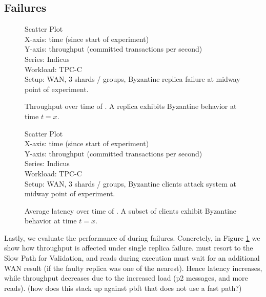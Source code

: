 \subsection{Failures}

\begin{figure}
  Scatter Plot\\
  X-axis: time (since start of experiment)\\
  Y-axis: throughput (committed transactions per second)\\
  Series: Indicus\\
  Workload: TPC-C\\
  Setup: WAN, 3 shards / groups, Byzantine replica failure at midway point of
  experiment.\\
  \caption{Throughput over time of \sys{}. A replica exhibits Byzantine
  behavior at time $t=x$.}
  \label{fig:failure-replica-tot}
\end{figure}

\begin{figure}
  Scatter Plot\\
  X-axis: time (since start of experiment)\\
  Y-axis: throughput (committed transactions per second)\\
  Series: Indicus\\
  Workload: TPC-C\\
  Setup: WAN, 3 shards / groups, Byzantine clients attack system at midway point
  of experiment.\\
  \caption{Average latency over time of \sys{}. A subset of clients exhibit
  Byzantine behavior at time $t=x$.}
  \label{fig:failure-clients-lot}
\end{figure}

Lastly, we evaluate the performance of \sys during failures. Concretely, in Figure \ref{fig:failure-replica-tot} we show how throughput is affected under single replica failure. \sys must resort to the Slow Path for Validation, and reads during execution must wait for an additional WAN result (if the faulty replica was one of the nearest). Hence latency increases, while throughput decreases due to the increased load (p2 messages, and more reads).
(how does this stack up against pbft that does not use a fast path?)

